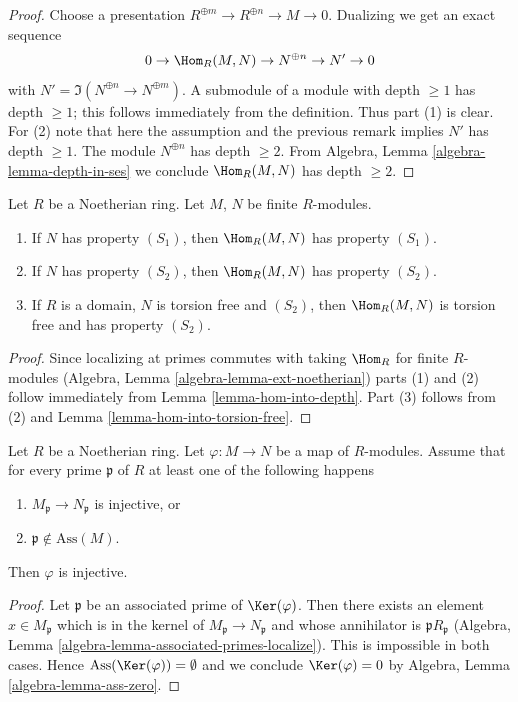 \begin{proof}
Choose a presentation $R^{\oplus m} \to R^{\oplus n} \to M \to 0$.
Dualizing we get an exact sequence
$$
0 \to \Hom_R(M, N) \to N^{\oplus n} \to N' \to 0
$$
with $N' = \Im(N^{\oplus n} \to N^{\oplus m})$. A submodule of a module
with depth $\geq 1$ has depth $\geq 1$; this follows immediately from
the definition. Thus part (1) is clear. For (2) note that here the
assumption and the previous remark implies $N'$ has depth $\geq 1$.
The module $N^{\oplus n}$ has depth $\geq 2$.
From Algebra, Lemma \ref{algebra-lemma-depth-in-ses}
we conclude $\Hom_R(M, N)$ has depth $\geq 2$.
\end{proof}

\begin{lemma}
\label{lemma-hom-into-S2}
Let $R$ be a Noetherian ring. Let $M$, $N$ be finite $R$-modules.
\begin{enumerate}
\item If $N$ has property $(S_1)$, then $\Hom_R(M, N)$ has property $(S_1)$.
\item If $N$ has property $(S_2)$, then $\Hom_R(M, N)$ has property $(S_2)$.
\item If $R$ is a domain, $N$ is torsion free and $(S_2)$, then
$\Hom_R(M, N)$ is torsion free and has property $(S_2)$.
\end{enumerate}
\end{lemma}

\begin{proof}
Since localizing at primes commutes with taking $\Hom_R$ for finite
$R$-modules (Algebra, Lemma \ref{algebra-lemma-ext-noetherian})
parts (1) and (2) follow immediately from Lemma \ref{lemma-hom-into-depth}.
Part (3) follows from (2) and
Lemma \ref{lemma-hom-into-torsion-free}.
\end{proof}

\begin{lemma}
\label{lemma-check-injective-on-ass}
Let $R$ be a Noetherian ring. Let $\varphi : M \to N$ be a map of
$R$-modules. Assume that for every prime $\mathfrak p$
of $R$ at least one of the following happens
\begin{enumerate}
\item $M_\mathfrak p \to N_\mathfrak p$ is injective, or
\item $\mathfrak p \not \in \text{Ass}(M)$.
\end{enumerate}
Then $\varphi$ is injective.
\end{lemma}

\begin{proof}
Let $\mathfrak p$ be an associated prime of $\Ker(\varphi)$.
Then there exists an element $x \in M_\mathfrak p$ which is
in the kernel of $M_\mathfrak p \to N_\mathfrak p$ and whose
annihilator is $\mathfrak pR_\mathfrak p$
(Algebra, Lemma \ref{algebra-lemma-associated-primes-localize}).
This is impossible in both cases. Hence
$\text{Ass}(\Ker(\varphi)) = \emptyset$ and we conclude $\Ker(\varphi) = 0$ by
Algebra, Lemma \ref{algebra-lemma-ass-zero}.
\end{proof}

